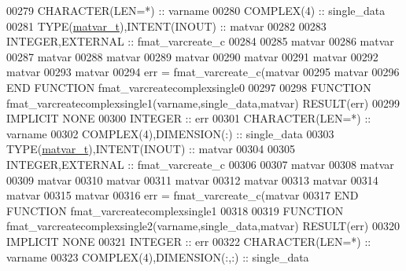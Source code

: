 \begin{DoxyCode}
00279     \textcolor{keywordtype}{CHARACTER(LEN=*)}                :: varname
00280     \textcolor{keywordtype}{COMPLEX(4)}                      :: single\_data
00281     \textcolor{keywordtype}{TYPE}(\hyperlink{group___m_a_t_structmatvar__t}{matvar\_t}),\textcolor{keywordtype}{INTENT(INOUT)}    :: matvar
00282 
00283     \textcolor{keywordtype}{INTEGER},\textcolor{keywordtype}{EXTERNAL}                :: fmat\_varcreate\_c
00284 
00285     matvar%
00286     matvar%
00287     matvar%
00288     matvar%
00289     matvar%
00290     matvar%
00291     matvar%
00292     matvar%
00293     matvar%
00294     err = fmat\_varcreate\_c(matvar%
00295                            matvar%
00296 \textcolor{keyword}{END FUNCTION }fmat\_varcreatecomplexsingle0
00297 
00298 \textcolor{keyword}{FUNCTION }fmat\_varcreatecomplexsingle1(varname,single\_data,matvar) \textcolor{keyword}{RESULT}(err)
00299 \textcolor{keywordtype}{IMPLICIT NONE}
00300     \textcolor{keywordtype}{INTEGER}                         :: err
00301     \textcolor{keywordtype}{CHARACTER(LEN=*)}                :: varname
00302     \textcolor{keywordtype}{COMPLEX(4)},\textcolor{keywordtype}{DIMENSION(:)}    :: single\_data
00303     \textcolor{keywordtype}{TYPE}(\hyperlink{group___m_a_t_structmatvar__t}{matvar\_t}),\textcolor{keywordtype}{INTENT(INOUT)}    :: matvar
00304 
00305     \textcolor{keywordtype}{INTEGER},\textcolor{keywordtype}{EXTERNAL}                :: fmat\_varcreate\_c
00306 
00307     matvar%
00308     matvar%
00309     matvar%
00310     matvar%
00311     matvar%
00312     matvar%
00313     matvar%
00314     matvar%
00315     matvar%
00316     err = fmat\_varcreate\_c(matvar%
00317 \textcolor{keyword}{END FUNCTION }fmat\_varcreatecomplexsingle1
00318 
00319 \textcolor{keyword}{FUNCTION }fmat\_varcreatecomplexsingle2(varname,single\_data,matvar) \textcolor{keyword}{RESULT}(err)
00320 \textcolor{keywordtype}{IMPLICIT NONE}
00321     \textcolor{keywordtype}{INTEGER}                         :: err
00322     \textcolor{keywordtype}{CHARACTER(LEN=*)}                :: varname
00323     \textcolor{keywordtype}{COMPLEX(4)},\textcolor{keywordtype}{DIMENSION(:,:)}   :: single\_data

\end{DoxyCode}
